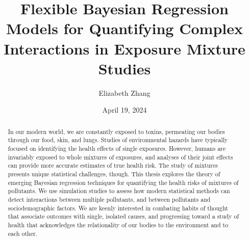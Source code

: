 \documentclass[12pt, twoside]{amherstthesis}
\title{Flexible Bayesian Regression Models for Quantifying Complex Interactions in Exposure Mixture Studies}
\author{Elizabeth Zhang}
\date{April 19, 2024}
\begin{document}
\doublespace
  \maketitle

\frontmatter %
\pagestyle{fancyplain}

  \begin{abstract}
    In our modern world, we are constantly exposed to toxins, permeating our bodies through our food, skin, and lungs. Studies of environmental hazards have typically focused on identifying the health effects of single exposures. However, humans are invariably exposed to whole mixtures of exposures, and analyses of their joint effects can provide more accurate estimates of true health risk. The study of mixtures presents unique statistical challenges, though. This thesis explores the theory of emerging Bayesian regression techniques for quantifying the health risks of mixtures of pollutants. We use simulation studies to assess how modern statistical methods can detect interactions between multiple pollutants, and between pollutants and sociodemographic factors. We are keenly interested in combating habits of thought that associate outcomes with single, isolated causes, and progressing toward a study of health that acknowledges the relationality of our bodies to the environment and to each other.
  \end{abstract}
\end{document}
